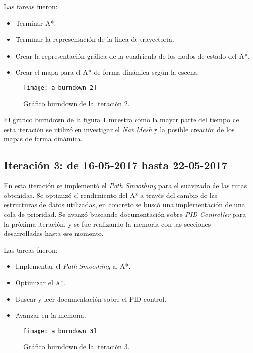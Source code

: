 Las tareas fueron:
\begin{itemize}
\item Terminar A*.
\item Terminar la representación de la línea de trayectoria.
\item Crear la representación gráfica de la cuadrícula de los nodos de estado del A*.
\item Crear el mapa para el A* de forma dinámica según la escena.
\end{itemize}

\begin{figure}[htpb]
    \centering
    \texttt{[image: a\_burndown\_2]}
    \caption[Gráfico burndown de la iteración 2]{Gráfico burndown de la iteración 2.}
    \label{fig:burndown2}
\end{figure}

El gráfico burndown de la figura \ref{fig:burndown2} muestra como la mayor parte del tiempo de esta iteración se utilizó en investigar el \textit{Nav Mesh} y la posible creación de los mapas de forma dinámica.

\newpage
\subsection{Iteración 3: de 16-05-2017 hasta 22-05-2017}
En esta iteración se implementó el \textit{Path Smoothing} para el suavizado de las rutas obtenidas. Se optimizó el rendimiento del A* a través del cambio de las estructuras de datos utilizadas, en concreto se buscó una implementación de una cola de prioridad. Se avanzó buscando documentación sobre \textit{PID Controller} para la próxima iteración, y se fue realizando la memoria con las secciones desarrolladas hasta ese momento.

Las tareas fueron:
\begin{itemize}
\item Implementar el \textit{Path Smoothing} al A*.
\item Optimizar el A*.
\item Buscar y leer documentación sobre el PID control.
\item Avanzar en la memoria.
\end{itemize}

\begin{figure}[htpb]
    \centering
    \texttt{[image: a\_burndown\_3]}
    \caption[Gráfico burndown de la iteración 3]{Gráfico burndown de la iteración 3.}
    \label{fig:burndown3}
\end{figure}

